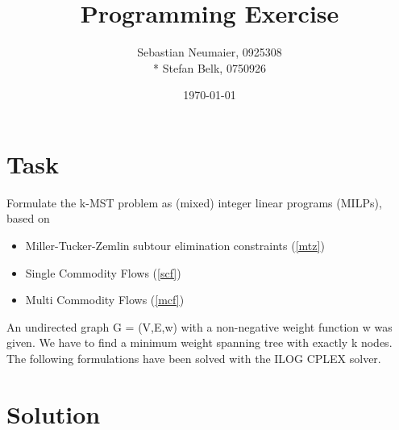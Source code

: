 \documentclass{article}
\title{Programming Exercise}
\author{Sebastian Neumaier, 0925308 \\* Stefan Belk, 0750926}
\date{\today}
\begin{document}
\maketitle

\section{Task}

Formulate the k-MST problem as (mixed) integer linear programs (MILPs), based on
\begin{itemize}
\item Miller-Tucker-Zemlin subtour elimination constraints (\ref{mtz})
\item Single Commodity Flows (\ref{scf})
\item Multi Commodity Flows (\ref{mcf})
\end{itemize}
An undirected graph G = (V,E,w) with a non-negative weight function w was given. We have to find a minimum weight spanning tree with exactly k nodes. The following formulations have been solved with the ILOG CPLEX solver.
\section{Solution}
\end{document}
